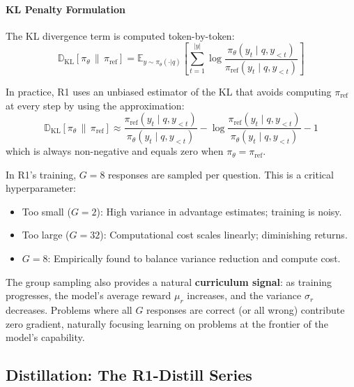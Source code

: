\paragraph{KL Penalty Formulation}
\label{kl-penalty-formulation}

The KL divergence term is computed token-by-token: 
\begin{equation}
    \mathbb{D}_{\mathrm{KL}}\!\left[\pi_\theta \,\|\, \pi_{\text{ref}}\right] = \mathbb{E}_{y \sim \pi_\theta(\cdot|q)} \left[ \sum_{t=1}^{|y|} \log \frac{\pi_\theta(y_t \mid q, y_{<t})}{\pi_{\text{ref}}(y_t \mid q, y_{<t})} \right]
\end{equation}

In practice, R1 uses an unbiased estimator of the KL that avoids computing $\pi_{\text{ref}}$ at every step by using the approximation: 
\begin{equation}
    \mathbb{D}_{\mathrm{KL}}\!\left[\pi_\theta \,\|\, \pi_{\text{ref}}\right] \approx \frac{\pi_{\text{ref}}(y_t \mid q, y_{<t})}{\pi_\theta(y_t \mid q, y_{<t})} - \log \frac{\pi_{\text{ref}}(y_t \mid q, y_{<t})}{\pi_\theta(y_t \mid q, y_{<t})} - 1
\end{equation}
 which is always non-negative and equals zero when $\pi_\theta = \pi_{\text{ref}}$.

\begin{examplebox}
In R1’s training, $G = 8$ responses are sampled per question. This is a critical hyperparameter:

\begin{itemize}
  \item Too small ($G=2$): High variance in advantage estimates; training is noisy.
  \item Too large ($G=32$): Computational cost scales linearly; diminishing returns.
  \item $G=8$: Empirically found to balance variance reduction and compute cost.
\end{itemize}

The group sampling also provides a natural \textbf{curriculum signal}: as training progresses, the model’s average reward $\mu_r$ increases, and the variance $\sigma_r$ decreases. Problems where all $G$ responses are correct (or all wrong) contribute zero gradient, naturally focusing learning on problems at the frontier of the model’s capability.
\end{examplebox}

\subsection{Distillation: The R1-Distill Series}
\label{distillation-the-r1-distill-series}


